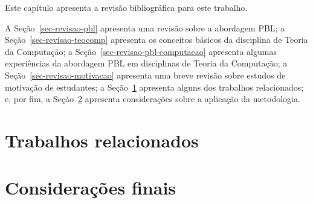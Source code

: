\label{cap-revisao}
\acresetall

Este capítulo apresenta a revisão bibliográfica para este trabalho.

A Seção~\ref{sec-revisao-pbl} apresenta uma revisão sobre a abordagem \ac{PBL};
a Seção~\ref{sec-revisao-teocomp} apresenta os conceitos básicos da disciplina
de Teoria da Computação;
a Seção~\ref{sec-revisao-pbl-computacao} apresenta algumas experiências da
abordagem \ac{PBL} em disciplinas de Teoria da Computação;
a Seção~\ref{sec-revisao-motivacao} apresenta uma breve revisão sobre
estudos de motivação de estudantes;
a Seção~\ref{sec-revisao-relacionados} apresenta alguns dos trabalhos
relacionados;
e, por fim, a Seção~\ref{sec-revisao-consideracoes} apresenta
considerações sobre a aplicação da metodologia.






\section{Trabalhos relacionados}
\label{sec-revisao-relacionados}
\section{Considerações finais}
\label{sec-revisao-consideracoes}
